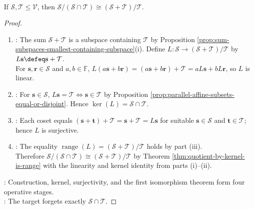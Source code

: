 \begin{theorem} \label{thm:second-isomorphism-vector-spaces} \\
If $\mathcal{S},\mathcal{T}\leq\mathcal{V}$, then $\mathcal{S}/(\mathcal{S}\cap\mathcal{T})\cong(\mathcal{S}+\mathcal{T})/\mathcal{T}$.
\begin{proof}
\begin{enumerate}[label=(\roman*)]
\setlength{\itemsep}{0pt}
\item {}: The sum $\mathcal{S}+\mathcal{T}$ is a subspace containing $\mathcal{T}$ by Proposition \ref{prop:sum-subspaces-smallest-containing-subspace}(i). Define $L:\mathcal{S}\to(\mathcal{S}+\mathcal{T})/\mathcal{T}$ by $L\mathbf{s}\defeq\mathbf{s}+\mathcal{T}$.\\
For $\mathbf{s},\mathbf{r}\in\mathcal{S}$ and $a,b\in\mathbb{F}$, $L(a\mathbf{s}+b\mathbf{r})=(a\mathbf{s}+b\mathbf{r})+\mathcal{T}=aL\mathbf{s}+bL\mathbf{r}$, so $L$ is linear.
\item {}: For $\mathbf{s}\in\mathcal{S}$, $L\mathbf{s}=\mathcal{T}\Longleftrightarrow\mathbf{s}\in\mathcal{T}$ by Proposition \ref{prop:parallel-affine-subsets-equal-or-disjoint}. Hence $\ker(L)=\mathcal{S}\cap\mathcal{T}$.
\item {}: Each coset equals $(\mathbf{s}+\mathbf{t})+\mathcal{T}=\mathbf{s}+\mathcal{T}=L\mathbf{s}$ for suitable $\mathbf{s}\in\mathcal{S}$ and $\mathbf{t}\in\mathcal{T}$; hence $L$ is surjective.
\item {}: The equality $\operatorname{range}(L)=(\mathcal{S}+\mathcal{T})/\mathcal{T}$ holds by part (iii).\\
Therefore $\mathcal{S}/(\mathcal{S}\cap\mathcal{T})\cong(\mathcal{S}+\mathcal{T})/\mathcal{T}$ by Theorem \ref{thm:quotient-by-kernel-is-range} with the linearity and kernel identity from parts (i)--(ii).
\end{enumerate}
: Construction, kernel, surjectivity, and the first isomorphism theorem form four operative stages.\\
: The target forgets exactly $\mathcal{S}\cap\mathcal{T}$.
\end{proof}
\end{theorem}


